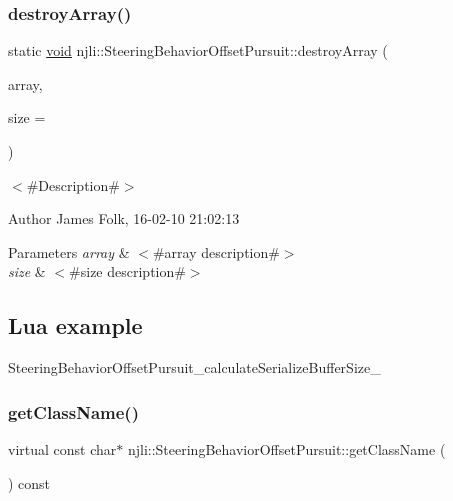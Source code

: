 \subsubsection{\texorpdfstring{destroy\+Array()}{destroyArray()}}
{\footnotesize\ttfamily static \mbox{\hyperlink{_thread_8h_af1e856da2e658414cb2456cb6f7ebc66}{void}} njli\+::\+Steering\+Behavior\+Offset\+Pursuit\+::destroy\+Array (\begin{DoxyParamCaption}\item[{\mbox{\hyperlink{classnjli_1_1_steering_behavior_offset_pursuit}{Steering\+Behavior\+Offset\+Pursuit}} $\ast$$\ast$}]{array,  }\item[{const \mbox{\hyperlink{_util_8h_a10e94b422ef0c20dcdec20d31a1f5049}{u32}}}]{size = {} }\end{DoxyParamCaption})\hspace{0.3cm}{\ttfamily [static]}}



$<$\#\+Description\#$>$ 

\begin{DoxyAuthor}{Author}
James Folk, 16-\/02-\/10 21\+:02\+:13
\end{DoxyAuthor}

\begin{DoxyParams}{Parameters}
{\em array} & $<$\#array description\#$>$ \\
\hline
{\em size} & $<$\#size description\#$>$\\
\hline
\end{DoxyParams}
\hypertarget{classnjli_1_1_steering_behavior_wander_ex1}{}\subsection{Lua example}\label{classnjli_1_1_steering_behavior_wander_ex1}

\begin{DoxyCodeInclude}
\end{DoxyCodeInclude}
Steering\+Behavior\+Offset\+Pursuit\+\_\+calculate\+Serialize\+Buffer\+Size\+\_\+ \mbox{\label{classnjli_1_1_steering_behavior_offset_pursuit_a0d864ea6805844cfc1de92f2c15493e9}} 
\subsubsection{\texorpdfstring{get\+Class\+Name()}{getClassName()}}
{\footnotesize\ttfamily virtual const char$\ast$ njli\+::\+Steering\+Behavior\+Offset\+Pursuit\+::get\+Class\+Name (\begin{DoxyParamCaption}{ }\end{DoxyParamCaption}) const\hspace{0.3cm}{\ttfamily [virtual]}}



